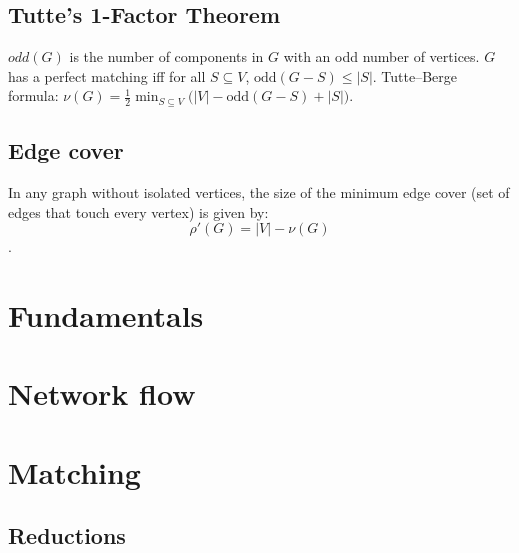 	\subsection{Tutte’s 1-Factor Theorem}
		$odd(G)$ is the number of components in $G$ with an odd number of vertices. 
		$G$ has a perfect matching iff for all $S\subseteq V$, $\text{odd}(G-S)\le |S|$.
		Tutte–Berge formula: $\displaystyle \nu(G)=\tfrac12\min_{S\subseteq V}\big(|V|-\text{odd}(G-S)+|S|\big)$. \\

	\subsection{Edge cover}
		In any graph without isolated vertices, the size of the minimum edge cover (set of edges that touch every vertex) is given by: \[\rho'(G)=|V|-\nu(G)\]. \\

\section{Fundamentals}

\section{Network flow}

\section{Matching}

	\subsection{Reductions}
	

